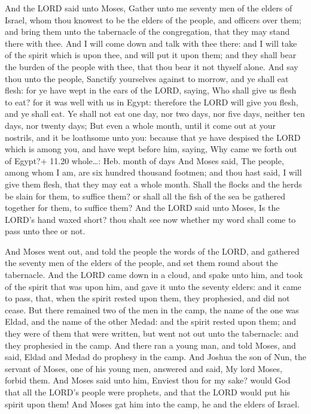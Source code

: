  And the LORD said unto Moses, Gather unto me seventy men
of the elders of Israel, whom thou knowest to be the elders of the
people, and officers over them; and bring them unto the tabernacle of
the congregation, that they may stand there with thee.  And
I will come down and talk with thee there: and I will take of the spirit
which is upon thee, and will put it upon them; and they shall bear the
burden of the people with thee, that thou bear it not thyself alone.
 And say thou unto the people, Sanctify yourselves against
to morrow, and ye shall eat flesh: for ye have wept in the ears of the
LORD, saying, Who shall give us flesh to eat? for it was well with us in
Egypt: therefore the LORD will give you flesh, and ye shall eat.
 Ye shall not eat one day, nor two days, nor five days,
neither ten days, nor twenty days;  But even a whole month,
until it come out at your nostrils, and it be loathsome unto you:
because that ye have despised the LORD which is among you, and have wept
before him, saying, Why came we forth out of Egypt?+ 11.20 whole\ldots:
Heb. month of days  And Moses said, The people, among whom
I am, are six hundred thousand footmen; and thou hast said, I will give
them flesh, that they may eat a whole month.  Shall the
flocks and the herds be slain for them, to suffice them? or shall all
the fish of the sea be gathered together for them, to suffice them?
 And the LORD said unto Moses, Is the LORD's hand waxed
short? thou shalt see now whether my word shall come to pass unto thee
or not.

 And Moses went out, and told the people the words of the
LORD, and gathered the seventy men of the elders of the people, and set
them round about the tabernacle.  And the LORD came down in
a cloud, and spake unto him, and took of the spirit that was upon him,
and gave it unto the seventy elders: and it came to pass, that, when the
spirit rested upon them, they prophesied, and did not cease.
 But there remained two of the men in the camp, the name of
the one was Eldad, and the name of the other Medad: and the spirit
rested upon them; and they were of them that were written, but went not
out unto the tabernacle: and they prophesied in the camp. 
And there ran a young man, and told Moses, and said, Eldad and Medad do
prophesy in the camp.  And Joshua the son of Nun, the
servant of Moses, one of his young men, answered and said, My lord
Moses, forbid them.  And Moses said unto him, Enviest thou
for my sake? would God that all the LORD's people were prophets, and
that the LORD would put his spirit upon them!  And Moses
gat him into the camp, he and the elders of Israel.

